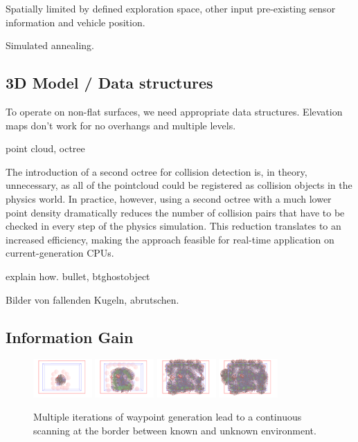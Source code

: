\documentclass[a4paper, 10pt, conference]{ieeeconf}      %
\begin{document}
Spatially limited by defined exploration space, other input pre-existing sensor information and vehicle position.

Simulated annealing.

\subsection{3D Model / Data structures}

To operate on non-flat surfaces, we need appropriate data structures. Elevation maps don't work for no overhangs and multiple levels.

point cloud, octree

The introduction of a second octree for collision detection is, in theory, unnecessary, as all of the pointcloud could be registered as collision objects in the physics world. In practice, however, using a second octree with a much lower point density dramatically reduces the number of collision pairs that have to be checked in every step of the physics simulation. This reduction translates to an increased efficiency, making the approach feasible for real-time application on current-generation CPUs.

explain how. bullet, btghostobject

Bilder von fallenden Kugeln, abrutschen.

\subsection{Information Gain}

\begin{figure}[ht]
  \centering
    \includegraphics[width=0.2\textwidth]{images/process1}
    \includegraphics[width=0.2\textwidth]{images/process2}
    \includegraphics[width=0.2\textwidth]{images/process3}
    \includegraphics[width=0.2\textwidth]{images/process4}
    \caption{Multiple iterations of waypoint generation lead to a continuous scanning at the border between known and unknown environment.}
\end{figure}
\end{document}
